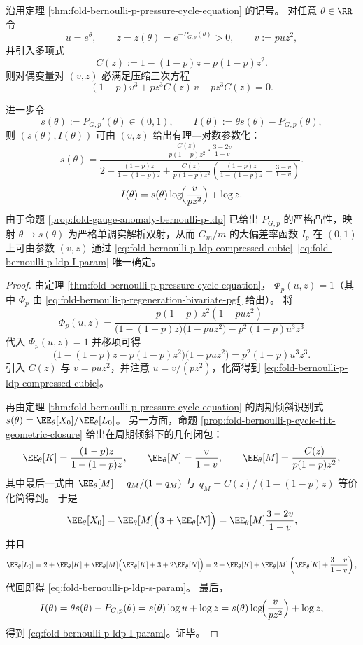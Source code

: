 \begin{theorem}[失配大偏差的代数参数化与压缩三次方程]\label{thm:fold-bernoulli-p-ldp-compressed-cubic-parametrization}
沿用定理 \ref{thm:fold-bernoulli-p-pressure-cycle-equation} 的记号。
对任意 \(\theta\in\RR\) 令
\[
u=e^\theta,\qquad z=z(\theta)=e^{-P_{G,p}(\theta)}>0,
\qquad v:=puz^2,
\]
并引入多项式
\[
C(z):=1-(1-p)z-p(1-p)z^2.
\]
则对偶变量对 \((v,z)\) 必满足压缩三次方程
\begin{equation}\label{eq:fold-bernoulli-p-ldp-compressed-cubic}
(1-p)v^3+pz^3C(z)\,v-pz^3C(z)=0.
\end{equation}

进一步令
\[
s(\theta):=P_{G,p}'(\theta)\in(0,1),\qquad
I(\theta):=\theta s(\theta)-P_{G,p}(\theta),
\]
则 \((s(\theta),I(\theta))\) 可由 \((v,z)\) 给出有理—对数参数化：
\begin{equation}\label{eq:fold-bernoulli-p-ldp-s-param}
s(\theta)=
\frac{\displaystyle \frac{C(z)}{p(1-p)z^2}\cdot\frac{3-2v}{1-v}}
{\displaystyle 2+\frac{(1-p)z}{1-(1-p)z}
+\frac{C(z)}{p(1-p)z^2}\left(
\frac{(1-p)z}{1-(1-p)z}+\frac{3-v}{1-v}
\right)}.
\end{equation}
\begin{equation}\label{eq:fold-bernoulli-p-ldp-I-param}
I(\theta)=s(\theta)\log\!\Bigl(\frac{v}{pz^2}\Bigr)+\log z.
\end{equation}
由于命题 \ref{prop:fold-gauge-anomaly-bernoulli-p-ldp} 已给出 \(P_{G,p}\) 的严格凸性，映射 \(\theta\mapsto s(\theta)\) 为严格单调实解析双射，从而 \(G_m/m\) 的大偏差率函数 \(I_p\) 在 \((0,1)\) 上可由参数 \((v,z)\) 通过
\eqref{eq:fold-bernoulli-p-ldp-compressed-cubic}--\eqref{eq:fold-bernoulli-p-ldp-I-param} 唯一确定。
\end{theorem}
\begin{proof}
由定理 \ref{thm:fold-bernoulli-p-pressure-cycle-equation}，
\(
\Phi_p(u,z)=1
\)（其中 \(\Phi_p\) 由 \eqref{eq:fold-bernoulli-p-regeneration-bivariate-pgf} 给出）。
将
\[
\Phi_p(u,z)=\frac{p(1-p)\,z^2(1-puz^2)}{\bigl(1-(1-p)z\bigr)\bigl(1-puz^2\bigr)-p^2(1-p)u^3z^3}
\]
代入 \(\Phi_p(u,z)=1\) 并移项可得
\[
\bigl(1-(1-p)z-p(1-p)z^2\bigr)\bigl(1-puz^2\bigr)=p^2(1-p)u^3z^3.
\]
引入 \(C(z)\) 与 \(v=puz^2\)，并注意 \(u=v/(pz^2)\)，化简得到
\eqref{eq:fold-bernoulli-p-ldp-compressed-cubic}。

再由定理 \ref{thm:fold-bernoulli-p-pressure-cycle-equation} 的周期倾斜识别式
\(
s(\theta)=\EE_\theta[X_0]/\EE_\theta[L_0]
\)。
另一方面，命题 \ref{prop:fold-bernoulli-p-cycle-tilt-geometric-closure} 给出在周期倾斜下的几何闭包：
\[
\EE_\theta[K]=\frac{(1-p)z}{1-(1-p)z},\qquad
\EE_\theta[N]=\frac{v}{1-v},
\qquad
\EE_\theta[M]=\frac{C(z)}{p(1-p)z^2},
\]
其中最后一式由
\(
\EE_\theta[M]=q_M/(1-q_M)
\)
与
\(
q_M=C(z)/(1-(1-p)z)
\)
等价化简得到。
于是
\[
\EE_\theta[X_0]=\EE_\theta[M]\Bigl(3+\EE_\theta[N]\Bigr)
=\EE_\theta[M]\frac{3-2v}{1-v},
\]
并且
\[
\EE_\theta[L_0]
=2+\EE_\theta[K]+\EE_\theta[M]\Bigl(\EE_\theta[K]+3+2\EE_\theta[N]\Bigr)
=2+\EE_\theta[K]+\EE_\theta[M]\left(\EE_\theta[K]+\frac{3-v}{1-v}\right),
\]
代回即得 \eqref{eq:fold-bernoulli-p-ldp-s-param}。
最后，
\[
I(\theta)=\theta s(\theta)-P_{G,p}(\theta)=s(\theta)\log u+\log z
=s(\theta)\log\!\Bigl(\frac{v}{pz^2}\Bigr)+\log z,
\]
得到 \eqref{eq:fold-bernoulli-p-ldp-I-param}。证毕。
\end{proof}

